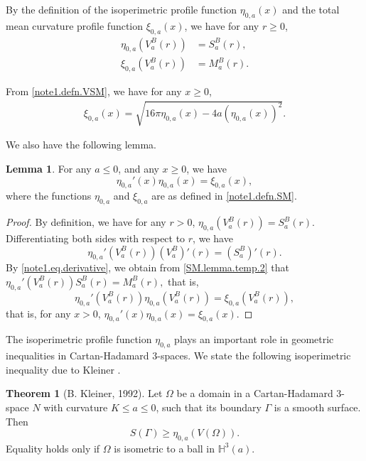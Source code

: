 \documentclass[11pt]{amsart}
\theoremstyle{definition}
\newcommand{\HH}{\mathbb{H}}
\newtheorem{thm}[prop]{Theorem}
\newtheorem{lem}[prop]{Lemma}
\theoremstyle{remark}
\numberwithin{equation}{section}
\begin{document}
		By the definition of the isoperimetric profile function $\eta_{0,a}(x)$ and the total mean curvature profile function $\xi_{0,a}(x)$, we have for any $r\geq0$,
		\begin{align}\label{note1.defn.SM}
			\eta_{0,a}(V_{a}^{B}(r)) &= S_{a}^{B}(r),\\
			\nonumber
			\xi_{0,a}(V_{a}^{B}(r)) &= M_{a}^{B}(r).
		\end{align}

		From \eqref{note1.defn.VSM}, we have for any $x\geq 0$,
		\begin{align}\label{SM.16pi-4a}
			\xi_{0,a}(x) = \sqrt{ 16\pi \eta_{0,a}(x) - 4 a (\eta_{0,a}(x))^2 }.
		\end{align}
		
		We also have the following lemma.
		\begin{lem}
			For any $a \leq 0$, and any $x\geq0$, we have
			\begin{equation}\label{SM.lemma}
				\eta_{0,a}'(x) \eta_{0,a}(x) = \xi_{0,a}(x),
			\end{equation}
			where the functions $\eta_{0,a}$ and $\xi_{0,a}$ are as defined in \eqref{note1.defn.SM}.
		\end{lem}
		\begin{proof}
			By definition, we have for any $r>0$,
			$\eta_{0,a}\left( V_{a}^{B}(r) \right) = S_{a}^{B}(r)$.
			Differentiating both sides with respect to $r$, we have
			\begin{equation}\label{SM.lemma.temp.2}
				\eta_{0,a}'\left( V_{a}^{B}(r) \right) (V_{a}^B)'(r) = (S_{a}^{B})'(r).
			\end{equation}
			By \eqref{note1.eq.derivative}, we obtain from \eqref{SM.lemma.temp.2} that
			$
			\eta_{0,a}'\left( V_{a}^{B}(r) \right) S_{a}^{B}(r) = M_{a}^{B}(r),
			$
			that is,
			$$
			\eta_{0,a}'\left( V_{a}^{B}(r) \right) \eta_{0,a}\left( V_{a}^{B}(r) \right) = \xi_{0,a}\left( V_{a}^{B}(r) \right),
			$$
			that is, for any $x>0$,
			$
			\eta_{0,a}'(x) \eta_{0,a}(x) = \xi_{0,a}(x).
			$
		\end{proof}
		
		The isoperimetric profile function $\eta_{0,a}$ plays an important role in geometric inequalities in Cartan-Hadamard 3-spaces. We state the following isoperimetric inequality due to Kleiner \cite{kleiner1992}.
		\begin{thm}[B. Kleiner, 1992]\label{thm:isoperi1}
			Let $\Omega$ be a domain in a Cartan-Hadamard 3-space $N$ with curvature $K\leq a\leq 0$, such that its boundary $\Gamma$ is a smooth surface. Then
			\begin{equation}
				\label{eq:isoperi1}
				S(\Gamma) \geq \eta_{0,a}(V(\Omega)).
			\end{equation}
			Equality holds only if $\Omega$ is isometric to a ball in $\HH^3(a)$.
		\end{thm}
		
\end{document}
